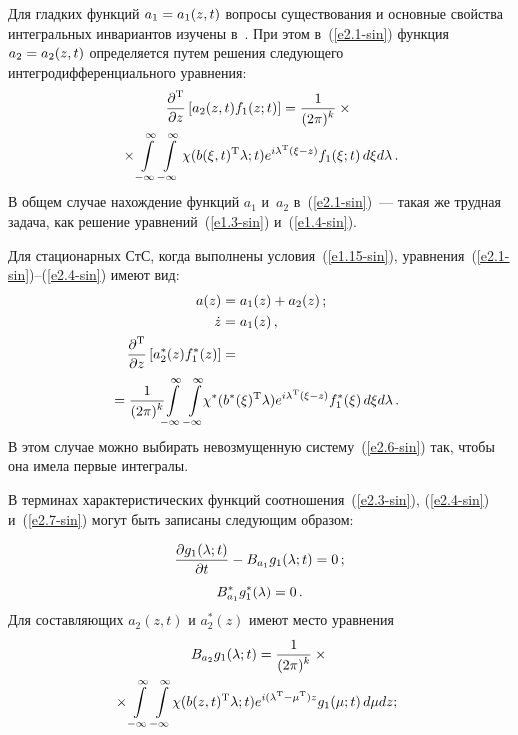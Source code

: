 \begin{multicols}{2}
Для гладких функций $a_1\hm=a_1(z,t)$ вопросы существования и основные свойства 
интегральных 
 инвариантов изучены в~\cite{16-sin, 17-sin}. При этом в~(\ref{e2.1-sin}) 
функция $a_2 \hm= a_2(z,t)$ определяется путем решения следующего интегродифференциального 
уравнения:
\begin{multline}
\displaystyle\frac{\displaystyle \partial^{\mathrm{T}}\mathstrut}{\displaystyle \partial z\mathstrut}\left[ a_2 (z,t) f_1(z;t) \right] 
=
\displaystyle\frac{\displaystyle 1\mathstrut}{\displaystyle (2\pi)^k\mathstrut}\times{}\\
{}\times \int\limits_{-\infty}^\infty\int\limits_{-\infty}^\infty \chi(b(\xi,t)^{\mathrm{T}} \lambda;t) 
e^{i\lambda^{\mathrm{T}}(\xi-z)} f_1(\xi;t)\, d\xi d\lambda\,.\label{e2.4-sin}
\end{multline}
В общем случае нахождение функций $a_1$ и~$a_2$ в~(\ref{e2.1-sin})~--- такая же
трудная задача, как решение уравнений~(\ref{e1.3-sin}) и~(\ref{e1.4-sin}).

Для стационарных СтС, когда выполнены условия~(\ref{e1.15-sin}), 
уравнения~(\ref{e2.1-sin})--(\ref{e2.4-sin}) имеют вид:
\begin{align}
a(z)&= a_1(z) + a_2(z)\,;\label{e2.5-sin}
\\
\dot z &= a_1(z)\,,\label{e2.6-sin}
\\
\fr{\prt^{\mathrm{T}}}{\prt z}\lk a_2^*(z) f_1^*(z)\rk &= {}\notag\\
&\hspace*{-28mm}{}=
\fr{1}{(2\pi)^k} \!\!\iin \iin\!\! \chi^* (b^*(\xi)^{\mathrm{T}} \la) 
e^{i\la^{\mathrm{T}}(\xi-z)} f_1^*(\xi)\, d\xi d\la\,.\!\!\!\label{e2.7-sin}
\end{align}
В этом случае можно выбирать невозмущенную сис\-те\-му~(\ref{e2.6-sin}) так, чтобы
она имела первые интегралы.

В терминах характеристических функций соотношения~(\ref{e2.3-sin}), (\ref{e2.4-sin})
и~(\ref{e2.7-sin}) могут быть записаны следующим образом:

\noindent
\begin{equation}
\displaystyle\frac{\displaystyle \partial g_1 (\lambda;t)\mathstrut}{\displaystyle \partial t\mathstrut} - B_{a_1} g_1(\lambda;t) =0\,;\label{e2.8-sin}
\end{equation}
\begin{equation*}
B_{a_1}^* g_1^*(\la) =0\,. %
\end{equation*}
Для составляющих $a_2(z,t)$ и $a_2^*(z)$ имеют место уравнения
\begin{multline}
B_{a_2} g_1(\la;t) 
= \fr{1}{(2\pi)^k} \times{}\\
\hspace*{-2.5mm}{}\times\iin\iin \!\chi(b(z,t)^{\mathrm{T}} \la;t) 
e^{i(\la^{\mathrm{T}}-\mu^{\mathrm{T}})z} g_1(\mu;t) \,d\mu dz;\label{e2.10-sin}
\end{multline}


\end{multicols}
